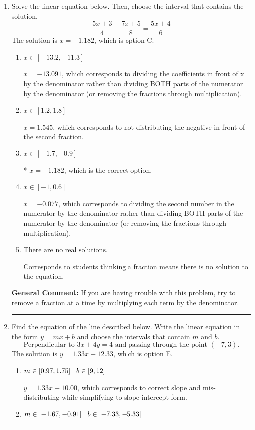 \documentclass{extbook}[14pt]
\newcommand{\litem}[1]{\item #1

\rule{\textwidth}{0.4pt}}
\begin{document}
\begin{enumerate}\litem{
Solve the linear equation below. Then, choose the interval that contains the solution.
\[ \frac{5x + 3}{4} - \frac{7x + 5}{8} = \frac{5x + 4}{6} \]The solution is \( x = -1.182 \), which is option C.\begin{enumerate}[label=\Alph*.]
\item \( x \in [-13.2, -11.3] \)

 $x = -13.091$, which corresponds to dividing the coefficients in front of x by the denominator rather than dividing BOTH parts of the numerator by the denominator (or removing the fractions through multiplication).
\item \( x \in [1.2, 1.8] \)

 $x = 1.545$, which corresponds to not distributing the negative in front of the second fraction.
\item \( x \in [-1.7, -0.9] \)

* $x = -1.182$, which is the correct option.
\item \( x \in [-1, 0.6] \)

 $x = -0.077$, which corresponds to dividing the second number in the numerator by the denominator rather than dividing BOTH parts of the numerator by the denominator (or removing the fractions through multiplication).
\item \( \text{There are no real solutions.} \)

Corresponds to students thinking a fraction means there is no solution to the equation.
\end{enumerate}

\textbf{General Comment:} If you are having trouble with this problem, try to remove a fraction at a time by multiplying each term by the denominator.
}
\litem{
Find the equation of the line described below. Write the linear equation in the form $ y=mx+b $ and choose the intervals that contain $m$ and $b$.
\[ \text{Perpendicular to } 3 x + 4 y = 4 \text{ and passing through the point } (-7, 3). \]The solution is \( y = 1.33x + 12.33 \), which is option E.\begin{enumerate}[label=\Alph*.]
\item \( m \in [0.97, 1.75] \hspace*{3mm} b \in [9, 12] \)

 $y = 1.33x + 10.00$, which corresponds to correct slope and mis-distributing while simplifying to slope-intercept form.
\item \( m \in [-1.67, -0.91] \hspace*{3mm} b \in [-7.33, -5.33] \)


\end{enumerate}}
\end{enumerate}
\end{document}

